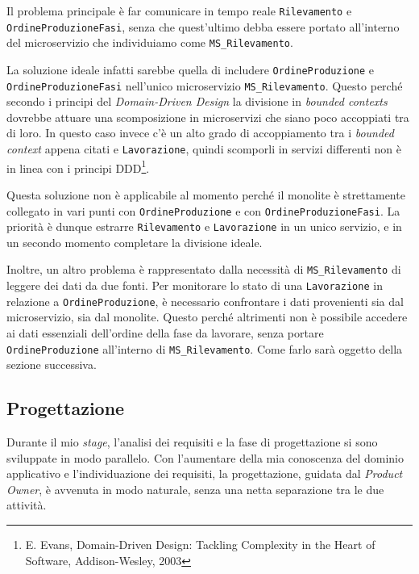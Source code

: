         \vspace{0.2 em}
        \noindent Il problema principale è far comunicare in tempo reale \texttt{Rilevamento} e \texttt{OrdineProduzioneFasi}, senza che quest'ultimo debba essere portato all'interno del microservizio che individuiamo come \texttt{MS\_Rilevamento}.

        \vspace{0.2 em}
        \noindent La soluzione ideale infatti sarebbe quella di includere \texttt{OrdineProduzione} e \texttt{OrdineProduzioneFasi} nell'unico microservizio \texttt{MS\_Rilevamento}. Questo perché secondo i principi del \textit{Domain-Driven Design} la divisione in \textit{bounded contexts} dovrebbe attuare una scomposizione in microservizi che siano poco accoppiati tra di loro. In questo caso invece c'è un alto grado di accoppiamento tra i \textit{bounded context} appena citati e  \texttt{Lavorazione}, quindi scomporli in servizi differenti non è in linea con i principi DDD\footnote{E. Evans, Domain-Driven Design: Tackling Complexity in the Heart of Software, Addison-Wesley, 2003}.

        \vspace{0.2 em}
        \noindent Questa soluzione non è applicabile al momento perché il monolite è strettamente collegato in vari punti con \texttt{OrdineProduzione} e con \texttt{OrdineProduzioneFasi}. La priorità è dunque estrarre \texttt{Rilevamento} e \texttt{Lavorazione} in un unico servizio, e in un secondo momento completare la divisione ideale.

        \vspace{0.2 em}
        \noindent Inoltre, un altro problema è rappresentato dalla necessità di \texttt{MS\_Rilevamento} di leggere dei dati da due fonti. Per monitorare lo stato di una \texttt{Lavorazione} in relazione a \texttt{OrdineProduzione}, è necessario confrontare i dati provenienti sia dal microservizio, sia dal monolite. Questo perché altrimenti non è possibile accedere ai dati essenziali dell'ordine della fase da lavorare, senza portare \texttt{OrdineProduzione} all'interno di \texttt{MS\_Rilevamento}. Come farlo sarà oggetto della sezione successiva. 

        \subsection{Progettazione}
        Durante il mio \textit{stage}, l’analisi dei requisiti e la fase di progettazione si sono sviluppate in modo parallelo. Con l’aumentare della mia conoscenza del dominio applicativo e l’individuazione dei requisiti, la progettazione, guidata dal \textit{Product Owner}, è avvenuta in modo naturale, senza una netta separazione tra le due attività.  

